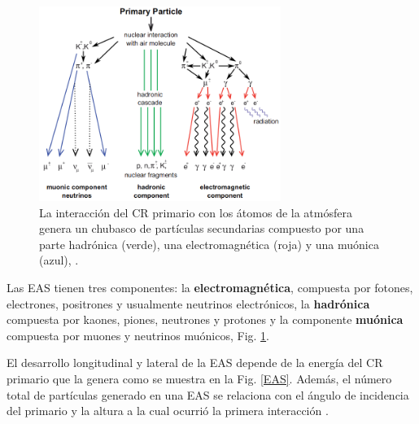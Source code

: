 \begin{figure}[h!]
\begin{center}
\includegraphics[width=0.7\textwidth]{Figures/EAS_Components}
\caption[Componentes de la lluvia aérea extendida]{La interacción del CR primario con los átomos de la atmósfera genera un chubasco de partículas secundarias compuesto por una parte hadrónica (verde), una electromagnética (roja) y una muónica (azul\textbf{}), \cite{Haungs2011}.}
\label{Components}
\end{center}
\end{figure}

Las EAS tienen tres componentes: la \textbf{electromagnética}, compuesta por fotones, electrones, positrones y usualmente neutrinos electrónicos, la \textbf{hadrónica} compuesta por kaones, piones, neutrones y protones y la componente \textbf{muónica} compuesta por muones y neutrinos muónicos, Fig. \ref{Components}.

El desarrollo longitudinal y lateral de la EAS depende de la energía del CR primario que la genera como se muestra en la Fig. \ref{EAS}. Además, el número total de partículas generado en una EAS se relaciona con el ángulo de incidencia del primario y la altura a la cual ocurrió la primera interacción \cite{Grieder2010}.

